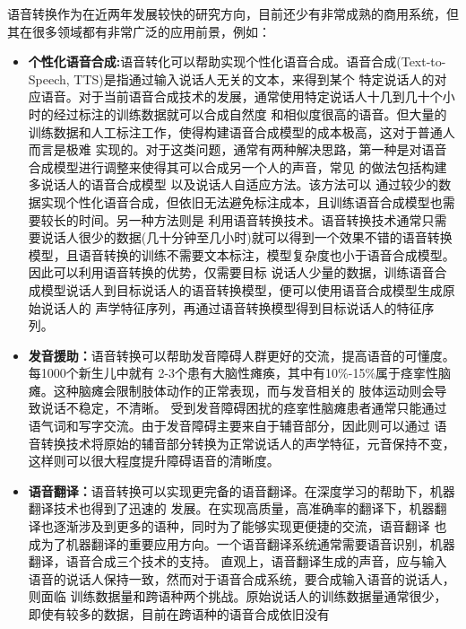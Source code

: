 语音转换作为在近两年发展较快的研究方向，目前还少有非常成熟的商用系统，但其在很多领域都有非常广泛的应用前景，例如：
\begin{itemize}
    \item \textbf{个性化语音合成:}语音转化可以帮助实现个性化语音合成。语音合成(Text-to-Speech, TTS)是指通过输入说话人无关的文本，来得到某个
    特定说话人的对应语音。对于当前语音合成技术的发展，通常使用特定说话人十几到几十个小时的经过标注的训练数据就可以合成自然度
    和相似度很高的语音。但大量的训练数据和人工标注工作，使得构建语音合成模型的成本极高，这对于普通人而言是极难
    实现的。对于这类问题，通常有两种解决思路，第一种是对语音合成模型进行调整来使得其可以合成另一个人的声音，常见
    的做法包括构建多说话人的语音合成模型\cite{gibiansky2017deep,ping2017deep,fan2015multi}
    以及说话人自适应方法\cite{tamura2001adaptation,wu2015study,yamagishi2009analysis}。该方法可以
    通过较少的数据实现个性化语音合成，但依旧无法避免标注成本，且训练语音合成模型也需要较长的时间。另一种方法则是
    利用语音转换技术\cite{kain1998spectral,arslan1999speaker}。语音转换技术通常只需要说话人很少的数据(几十分钟至几小时)就可以得到一个效果不错的语音转换
    模型，且语音转换的训练不需要文本标注，模型复杂度也小于语音合成模型。因此可以利用语音转换的优势，仅需要目标
    说话人少量的数据，训练语音合成模型说话人到目标说话人的语音转换模型，便可以使用语音合成模型生成原始说话人的
    声学特征序列，再通过语音转换模型得到目标说话人的特征序列。
    \item \textbf{发音援助：}语音转换可以帮助发音障碍人群更好的交流，提高语音的可懂度。每1000个新生儿中就有
    2-3个患有大脑性瘫痪，其中有10\%-15\%属于痉挛性脑瘫。这种脑瘫会限制肢体动作的正常表现，而与发音相关的
    肢体运动则会导致说话不稳定，不清晰\cite{hollegaard2013joint,aihara2013individuality}。
    受到发音障碍困扰的痉挛性脑瘫患者通常只能通过语气词和写字交流。由于发音障碍主要来自于辅音部分，因此则可以通过
    语音转换技术将原始的辅音部分转换为正常说话人的声学特征，元音保持不变，这样则可以很大程度提升障碍语音的清晰度。
    \item \textbf{语音翻译：}语音转换可以实现更完备的语音翻译。在深度学习的帮助下，机器翻译技术也得到了迅速的
    发展。在实现高质量，高准确率的翻译下，机器翻译也逐渐涉及到更多的语种，同时为了能够实现更便捷的交流，语音翻译
    也成为了机器翻译的重要应用方向。一个语音翻译系统通常需要语音识别，机器翻译，语音合成三个技术的支持。
    直观上，语音翻译生成的声音，应与输入语音的说话人保持一致，然而对于语音合成系统，要合成输入语音的说话人，则面临
    训练数据量和跨语种两个挑战。原始说话人的训练数据量通常很少，即使有较多的数据，目前在跨语种的语音合成依旧没有

\end{itemize}

